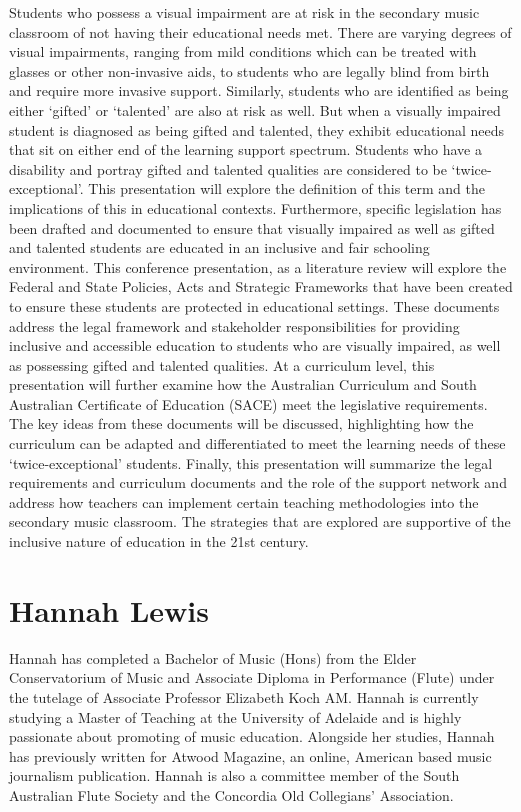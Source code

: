 \documentclass[twoside,12pt,a4paper,notitlepage]{memoir}
\begin{document}
Students who possess a visual impairment are at risk in the secondary music classroom of not having their educational needs met. There are varying degrees of visual impairments, ranging from mild conditions which can be treated with glasses or other non-invasive aids, to students who are legally blind from birth and require more invasive support. Similarly, students who are identified as being either ‘gifted’ or ‘talented’ are also at risk as well. But when a visually impaired student is diagnosed as being gifted and talented, they exhibit educational needs that sit on either end of the learning support spectrum. Students who have a disability and portray gifted and talented qualities are considered to be ‘twice-exceptional’. This presentation will explore the definition of this term and the implications of this in educational contexts.
Furthermore, specific legislation has been drafted and documented to ensure that visually impaired as well as gifted and talented students are educated in an inclusive and fair schooling environment. This conference presentation, as a literature review will explore the Federal and State Policies, Acts and Strategic Frameworks that have been created to ensure these students are protected in educational settings. These documents address the legal framework and stakeholder responsibilities for providing inclusive and accessible education to students who are visually impaired, as well as possessing gifted and talented qualities. At a curriculum level, this presentation will further examine how the Australian Curriculum and South Australian Certificate of Education (SACE) meet the legislative requirements. The key ideas from these documents will be discussed, highlighting how the curriculum can be adapted and differentiated to meet the learning needs of these ‘twice-exceptional’ students.
Finally, this presentation will summarize the legal requirements and curriculum documents and the role of the support network and address how teachers can implement certain teaching methodologies into the secondary music classroom. The strategies that are explored are supportive of the inclusive nature of education in the 21st century.

\section*{Hannah Lewis}

Hannah has completed a Bachelor of Music (Hons) from the Elder Conservatorium of Music and Associate Diploma in Performance (Flute) under the tutelage of Associate Professor Elizabeth Koch AM. Hannah is currently studying a Master of Teaching at the University of Adelaide and is highly passionate about promoting of music education. Alongside her studies, Hannah has previously written for Atwood Magazine, an online, American based music journalism publication. Hannah is also a committee member of the South Australian Flute Society and the Concordia Old Collegians’ Association.
\end{document}
